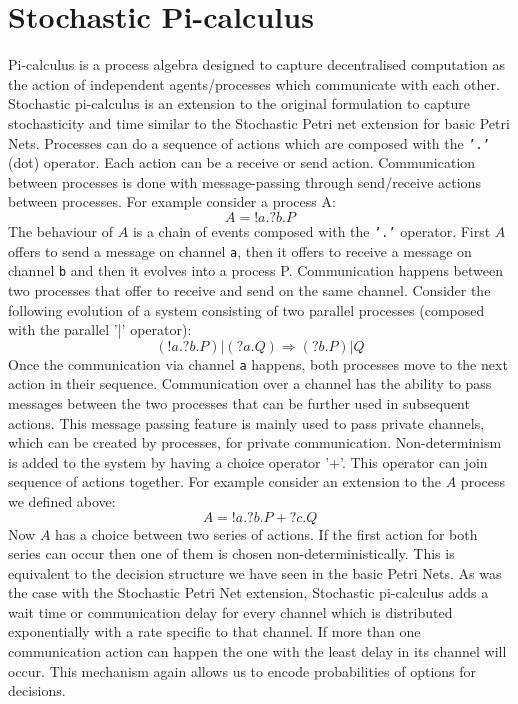 \section{Stochastic Pi-calculus}
Pi-calculus is a process algebra designed to capture decentralised
computation as the action of independent agents/processes which
communicate with each other. Stochastic pi-calculus is an extension to
the original formulation to capture stochasticity and time similar to
the Stochastic Petri net extension for basic Petri Nets. Processes can
do a sequence of actions which are composed with the \texttt{'.'} (dot)
operator. Each action can be a receive or send 
action. Communication between processes is done with
message-passing through send/receive actions between processes. For
example consider a process A:
\begin{equation*}
A = !a.?b.P
\end{equation*}
The behaviour of $A$ is a chain of events composed with the
\texttt{'.'} operator. First $A$ offers to send a message on channel
\texttt{a}, then it offers to receive a message on channel \texttt{b}
and then it evolves into a process P. Communication happens between two
processes that offer to receive and send on the same channel. Consider
the following evolution of a system consisting of two parallel
processes (composed
with the parallel '|' operator):
\begin{equation*}
(!a.?b.P) | (?a.Q) \Rightarrow (?b.P) | Q
\end{equation*}
Once the communication via channel \texttt{a} happens, both processes
move to the next action in their sequence. Communication over a
channel has the ability to pass messages between the two processes
that can be further used in subsequent actions. This message passing
feature is mainly used to pass private channels, which can be created
by processes, for private communication. Non-determinism is added to
the system by having a choice operator '+'. This operator can join
sequence of actions together. For example consider an extension to the
$A$ process we defined above:
\begin{equation*}
A = !a.?b.P + ?c.Q
\end{equation*}
Now $A$ has a choice between two series of actions. If the first action
for both series can occur then one of them is chosen
non-deterministically. This is equivalent to the decision structure we
have seen in the basic Petri Nets. As was the case with the Stochastic
Petri Net extension, Stochastic pi-calculus adds a wait time or
communication delay for every channel which is distributed
exponentially with a rate specific to that channel. If more than one
communication action can happen the one with the least delay in its
channel will occur. This mechanism again allows us to encode
probabilities of options for decisions.

